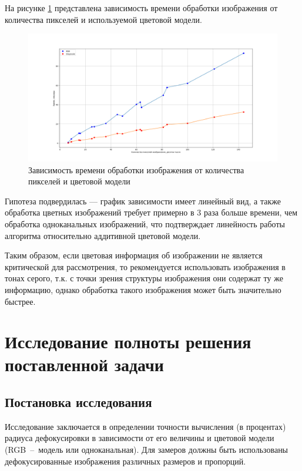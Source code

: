 \clearpage

На рисунке \ref{speed} представлена зависимость времени обработки изображения от количества пикселей и используемой цветовой модели.

\begin{figure}[!h]
	\centering
	\includegraphics[scale=0.37]{assets/speed}
	\caption{Зависимость времени обработки изображения от количества пикселей и цветовой модели}
	\label{speed}
\end{figure}

Гипотеза подвердилась --- график зависимости имеет линейный вид, а также обработка цветных изображений требует примерно в 3 раза больше времени, чем обработка одноканальных изображений, что подтверждает линейность работы алгоритма относительно аддитивной цветовой модели. 

Таким образом, если цветовая информация об изображении не является критической для рассмотрения, то рекомендуется использовать изображения в тонах серого, т.к. с точки зрения структуры изображения они содержат ту же информацию, однако обработка такого изображения может быть значительно быстрее.

\section{Исследование полноты решения поставленной задачи}

\subsection*{Постановка исследования}

Исследование заключается в определении точности вычисления (в процентах) радиуса дефокусировки в зависимости от его величины и цветовой модели (RGB~--~модель или одноканальная). Для замеров должны быть использованы дефокусированные изображения различных размеров и пропорций.


